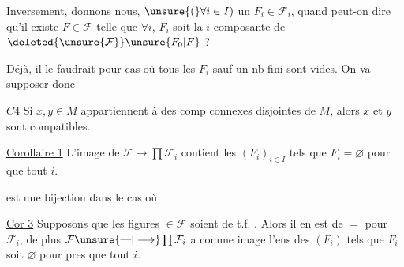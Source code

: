 Inversement, donnons nous,  $\unsure{(}\forall i\in I)$ un $F_i\in\mathcal F_i$, quand peut-on dire qu'il existe $F\in\mathcal F$ telle que $\forall i$, $F_i$ soit la $i$ composante de $\deleted{\unsure{\mathcal F}}\unsure{F_0|F}$ ?

Déjà, il le faudrait pour  cas où tous les $F_i$ sauf un nb fini sont \deleted{$\varnothing$} vides. On va supposer donc

\uline{$C4$} Si $x,y\in M$ appartiennent à des comp connexes disjointes de $M$, alors $x$ et $y$ sont compatibles.

 

\uline{Corollaire 1} L'image de $\mathcal F\to\prod\mathcal F_i$ contient les $(F_i)_{i\in I}$ tels que $F_i=\varnothing$  pour  que tout $i$.

est une bijection dans le  cas où  



\uline{Cor 3} Supposons que les figures  $\in\mathcal F$ soient de t.f.  . Alors il en est de $=$  pour $\mathcal F_i$, de plus $\mathcal F\unsure{\text{---}|\longrightarrow}\prod\mathcal F_i$ a comme image l'ens des $(F_i)$ tels que $F_i$ soit $\varnothing$ pour pres que tout $i$.
